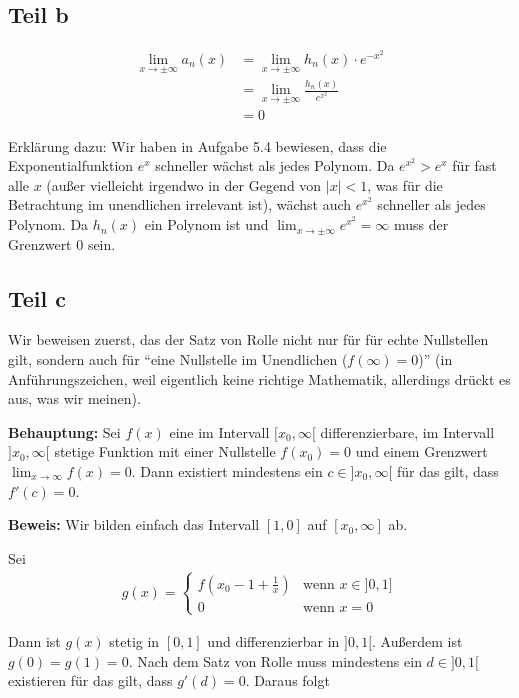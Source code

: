 \documentclass[a4paper,german,12pt,smallheadings]{scrartcl}
\begin{document}
\subsection*{Teil b}

\begin{align*}
  \lim_{x \to \pm \infty} a_n(x) &= \lim_{x \to \pm \infty} h_n(x) \cdot e^{-x^2} \\
  &= \lim_{x \to \pm \infty} \frac{h_n(x)}{e^{x^2}} \\
  &= 0
\end{align*}

Erklärung dazu: Wir haben in Aufgabe 5.4 bewiesen, dass die Exponentialfunktion
$e^x$ schneller wächst als jedes Polynom. Da $e^{x^2} > e^x$ für fast alle $x$
(außer vielleicht irgendwo in der Gegend von $|x| < 1$, was für die Betrachtung
im unendlichen irrelevant ist), wächst auch $e^{x^2}$ schneller als jedes
Polynom. Da $h_n(x)$ ein Polynom ist und $\lim_{x \to \pm \infty} e^{x^2} =
\infty$ muss der Grenzwert 0 sein.

\subsection*{Teil c}

Wir beweisen zuerst, das der Satz von Rolle nicht nur für für echte Nullstellen
gilt, sondern auch für ``eine Nullstelle im Unendlichen ($f(\infty) = 0$)'' (in
Anführungszeichen, weil eigentlich keine richtige Mathematik, allerdings drückt
es aus, was wir meinen).

\textbf{Behauptung:} Sei $f(x)$ eine im Intervall $[x_0, \infty[$
differenzierbare, im Intervall $]x_0, \infty[$ stetige Funktion mit einer
Nullstelle $f(x_0) = 0$ und einem Grenzwert $\lim_{x \to \infty} f(x) = 0$.
Dann existiert mindestens ein $c \in ]x_0, \infty[$ für das gilt, dass $f'(c) =
0$.

\textbf{Beweis:} Wir bilden einfach das Intervall $[1, 0]$ auf $[x_0, \infty]$
ab.

Sei
\begin{align*}
  g(x) = \begin{cases}
    f\left(x_0 - 1 + \frac{1}{x}\right) & \text{wenn } x \in ]0,1] \\
    0                                   & \text{wenn } x = 0
  \end{cases}
\end{align*}

Dann ist $g(x)$ stetig in $[0,1]$ und differenzierbar in $]0, 1[$. Außerdem
ist $g(0) = g(1) = 0$. Nach dem Satz von Rolle muss mindestens ein $d \in ]0,1[$
existieren für das gilt, dass $g'(d) = 0$. Daraus folgt 
\end{document}

